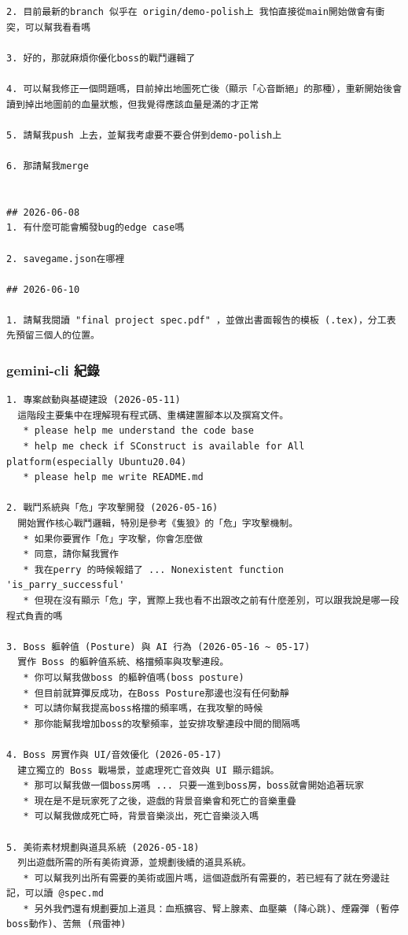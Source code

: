 \documentclass[12pt,a4paper]{article}
\begin{document}
\begin{lstlisting}[caption={楊立宇使用 Codex CLI 的 prompt 紀錄}]
2. 目前最新的branch 似乎在 origin/demo-polish上 我怕直接從main開始做會有衝突，可以幫我看看嗎

3. 好的，那就麻煩你優化boss的戰鬥邏輯了

4. 可以幫我修正一個問題嗎，目前掉出地圖死亡後（顯示「心音斷絕」的那種），重新開始後會讀到掉出地圖前的血量狀態，但我覺得應該血量是滿的才正常

5. 請幫我push 上去，並幫我考慮要不要合併到demo-polish上

6. 那請幫我merge


## 2026-06-08
1. 有什麼可能會觸發bug的edge case嗎

2. savegame.json在哪裡

## 2026-06-10

1. 請幫我閱讀 "final project spec.pdf" ，並做出書面報告的模板 (.tex)，分工表先預留三個人的位置。
\end{lstlisting}

\subsubsection{gemini-cli 紀錄}
\begin{lstlisting}[caption={楊立宇使用 gemini-cli 的 prompt 紀錄}]
1. 專案啟動與基礎建設 (2026-05-11)
  這階段主要集中在理解現有程式碼、重構建置腳本以及撰寫文件。
   * please help me understand the code base
   * help me check if SConstruct is available for All platform(especially Ubuntu20.04)
   * please help me write README.md

2. 戰鬥系統與「危」字攻擊開發 (2026-05-16)
  開始實作核心戰鬥邏輯，特別是參考《隻狼》的「危」字攻擊機制。
   * 如果你要實作「危」字攻擊，你會怎麼做
   * 同意，請你幫我實作
   * 我在perry 的時候報錯了 ... Nonexistent function 'is_parry_successful'
   * 但現在沒有顯示「危」字，實際上我也看不出跟改之前有什麼差別，可以跟我說是哪一段程式負責的嗎

3. Boss 軀幹值 (Posture) 與 AI 行為 (2026-05-16 ~ 05-17)
  實作 Boss 的軀幹值系統、格擋頻率與攻擊連段。
   * 你可以幫我做boss 的軀幹值嗎(boss posture)
   * 但目前就算彈反成功，在Boss Posture那邊也沒有任何動靜
   * 可以請你幫我提高boss格擋的頻率嗎，在我攻擊的時候
   * 那你能幫我增加boss的攻擊頻率，並安排攻擊連段中間的間隔嗎

4. Boss 房實作與 UI/音效優化 (2026-05-17)
  建立獨立的 Boss 戰場景，並處理死亡音效與 UI 顯示錯誤。
   * 那可以幫我做一個boss房嗎 ... 只要一進到boss房，boss就會開始追著玩家
   * 現在是不是玩家死了之後，遊戲的背景音樂會和死亡的音樂重疊
   * 可以幫我做成死亡時，背景音樂淡出，死亡音樂淡入嗎

5. 美術素材規劃與道具系統 (2026-05-18)
  列出遊戲所需的所有美術資源，並規劃後續的道具系統。
   * 可以幫我列出所有需要的美術或圖片嗎，這個遊戲所有需要的，若已經有了就在旁邊註記，可以讀 @spec.md
   * 另外我們還有規劃要加上道具：血瓶擴容、腎上腺素、血壓藥 (降心跳)、煙霧彈 (暫停boss動作)、苦無 (飛雷神)
\end{lstlisting}
\end{document}
